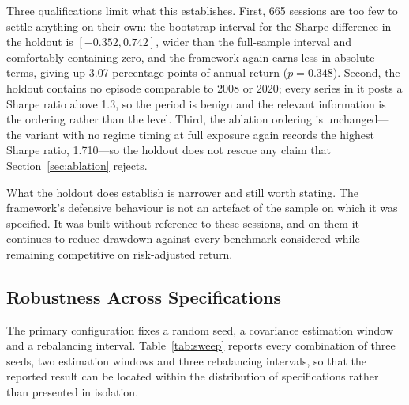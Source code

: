 \documentclass{singlecol-new}
\theoremstyle{TH}{
\newtheorem{lemma}{Lemma}
\newtheorem{theorem}[lemma]{Theorem}
\newtheorem{corrolary}[lemma]{Corrolary}
\newtheorem{conjecture}[lemma]{Conjecture}
\newtheorem{proposition}[lemma]{Proposition}
\newtheorem{claim}[lemma]{Claim}
\newtheorem{stheorem}[lemma]{Wrong Theorem}
\newtheorem{algorithm}{Algorithm}
}
\theoremstyle{THrm}{
\newtheorem{definition}{Definition}[section]
\newtheorem{question}{Question}[section]
\newtheorem{remark}{Remark}
\newtheorem{scheme}{Scheme}
}
\theoremstyle{THhit}{
\newtheorem{case}{Case}[section]
}
\begin{document}
Three qualifications limit what this establishes. First, 665 sessions are too few to
settle anything on their own: the bootstrap interval for the Sharpe difference in the
holdout is $[-0.352, 0.742]$, wider than the full-sample interval and comfortably
containing zero, and the framework again earns less in absolute terms, giving up 3.07
percentage points of annual return ($p = 0.348$). Second, the holdout contains no
episode comparable to 2008 or 2020; every series in it posts a Sharpe ratio above 1.3,
so the period is benign and the relevant information is the ordering rather than the
level. Third, the ablation ordering is unchanged---the variant with no regime timing at
full exposure again records the highest Sharpe ratio, 1.710---so the holdout does not
rescue any claim that Section~\ref{sec:ablation} rejects.

What the holdout does establish is narrower and still worth stating. The framework's
defensive behaviour is not an artefact of the sample on which it was specified. It was
built without reference to these sessions, and on them it continues to reduce drawdown
against every benchmark considered while remaining competitive on risk-adjusted return.

\subsection{Robustness Across Specifications}
\label{sec:robust}

The primary configuration fixes a random seed, a covariance estimation window and a
rebalancing interval. Table~\ref{tab:sweep} reports every combination of three seeds, two estimation
windows and three rebalancing intervals, so that the reported result can be located
within the distribution of specifications rather than presented in isolation.
\end{document}
